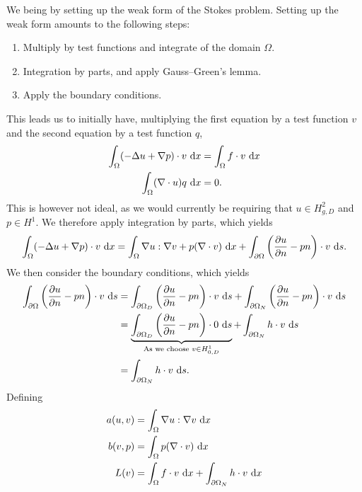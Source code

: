 We being by setting up the weak form of the Stokes problem.
Setting up the weak form amounts to the following steps:
\begin{enumerate}
    \item Multiply by test functions and integrate of the domain $\Omega$.

    \item Integration by parts, and apply Gauss--Green's lemma. %

    \item Apply the boundary conditions.
\end{enumerate}
This leads us to initially have, multiplying the first equation by a test function $v$ and the second equation by a test function $q$,
\begin{equation}
    \begin{split}
        \int_\Omega (-\Delta u + \nabla p) \cdot v \, \mathop{}\!\mathrm{d} x &= \int_\Omega f \cdot v \, \mathop{}\!\mathrm{d} x \\
        \int_\Omega (\nabla \cdot u) q \, \mathop{}\!\mathrm{d} x &= 0.
    \end{split}
\end{equation}
This is however not ideal, as we would currently be requiring that $u \in H_{g, D}^2$ and $p \in H^1$.
We therefore apply integration by parts, which yields
\begin{equation}
    \int_\Omega (-\Delta u + \nabla p) \cdot v \, \mathop{}\!\mathrm{d} x
    = \int_\Omega \nabla u : \nabla v + p (\nabla \cdot v) \, \mathop{}\!\mathrm{d} x
    + \int_{\partial\Omega} \left(\frac{\partial u}{\partial n} - p n\right) \cdot v \, \mathop{}\!\mathrm{d} s.
\end{equation}
We then consider the boundary conditions, which yields
\begin{align*}
    \int_{\partial\Omega} \left(\frac{\partial u}{\partial n} - p n\right) \cdot v \, \mathop{}\!\mathrm{d} s
    &= {
        \int_{\partial\Omega_D} \left(\frac{\partial u}{\partial n} - p n\right) \cdot v \, \mathop{}\!\mathrm{d} s
        + \int_{\partial\Omega_N} \left(\frac{\partial u}{\partial n} - p n\right) \cdot v \, \mathop{}\!\mathrm{d} s
    } \\
    &= {
        \underbrace{
            \int_{\partial\Omega_D} \left(\frac{\partial u}{\partial n} - p n\right) \cdot 0 \, \mathop{}\!\mathrm{d} s
        }_{\text{As we choose } v \in H^1_{0, D}}
        + \int_{\partial\Omega_N} h \cdot v \, \mathop{}\!\mathrm{d} s
    } \\
    &= \int_{\partial\Omega_N} h \cdot v \, \mathop{}\!\mathrm{d} s.
\end{align*}
Defining
\begin{equation}
    \begin{split}
        a(u, v) &= \int_{\Omega} \nabla u : \nabla v \, \mathop{}\!\mathrm{d} x \\
        b(v, p) &= \int_{\Omega} p (\nabla \cdot v) \, \mathop{}\!\mathrm{d} x \\
        L(v) &= \int_{\Omega} f \cdot v \, \mathop{}\!\mathrm{d} x + \int_{\partial\Omega_N} h \cdot v \, \mathop{}\!\mathrm{d} x
    \end{split}
\end{equation}
